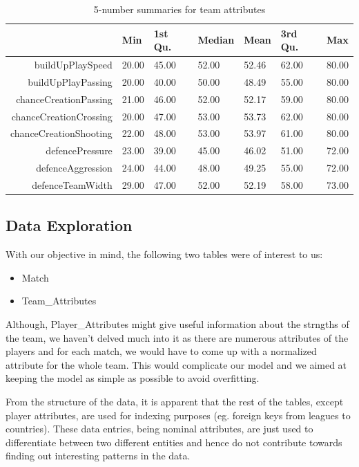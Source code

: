 \documentclass[11pt]{article}
\begin{document}
\begin{table}[ht]
\centering
\begin{tabular}{rllllll}
  \hline
                 & Min     & 1st Qu. & Median  & Mean    & 3rd Qu. & Max \\
  \hline
buildUpPlaySpeed & 20.00   & 45.00   & 52.00   & 52.46   & 62.00   & 80.00   \\
  buildUpPlayPassing & 20.00   & 40.00   & 50.00   & 48.49   & 55.00   & 80.00   \\
  chanceCreationPassing & 21.00   & 46.00   & 52.00   & 52.17   & 59.00   & 80.00   \\
  chanceCreationCrossing & 20.00   & 47.00   & 53.00   & 53.73   & 62.00   & 80.00   \\
  chanceCreationShooting & 22.00   & 48.00   & 53.00   & 53.97   & 61.00   & 80.00   \\
  defencePressure & 23.00   & 39.00   & 45.00   & 46.02   & 51.00   & 72.00   \\
  defenceAggression & 24.00   & 44.00   & 48.00   & 49.25   & 55.00   & 72.00   \\
  defenceTeamWidth & 29.00   & 47.00   & 52.00   & 52.19   & 58.00   & 73.00   \\
   \hline
\end{tabular}
\caption{5-number summaries for team attributes}
\label{tab:desc-stat}
\end{table}

\subsection{Data Exploration}
With our objective in mind, the following two tables were of interest to us:
\begin{itemize}
  \setlength\itemsep{0em}
  \item Match
  \item Team\_Attributes
\end{itemize}
Although, Player\_Attributes might give useful information about the strngths of the team, we haven't delved much into it as there are numerous attributes of the players and for each match, we would have to come up with a normalized attribute for the whole team. This would complicate our model and we aimed at keeping the model as simple as possible to avoid overfitting.

From the structure of the data, it is apparent that the rest of the tables, except player attributes, are used for indexing purposes (eg. foreign keys from leagues to countries).
These data entries, being nominal attributes, are just used to differentiate between two different entities and hence do not contribute towards finding out interesting patterns in the data.
\end{document}

